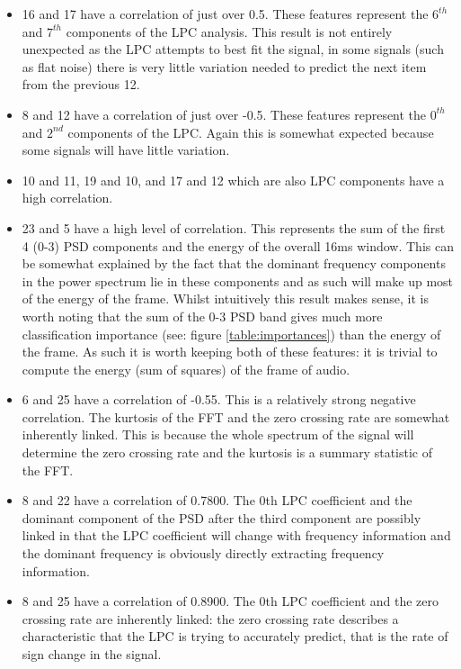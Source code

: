 \documentclass[ %
                    author={Sam Phippen},
                supervisor={Dr. Rafal Bogacz},
                     title={Real time voice activity detectors in noisy personal computing environments},
                  subtitle={},
                    degree={MEng},
                      year={2012} ]{thesis}
\begin{document}
\begin{itemize}

    \item 16 and 17 have a correlation of just over 0.5. These features
        represent the $6^{th}$ and $7^{th}$ components of the LPC analysis.
        This result is not entirely unexpected as the LPC attempts to best fit
        the signal, in some signals (such as flat noise) there is very little
        variation needed to predict the next item from the previous 12.

    \item 8 and 12 have a correlation of just over -0.5. These features
        represent the $0^{th}$ and $2^{nd}$ components of the LPC. Again this
        is somewhat expected because some signals will have little variation.

    \item 10 and 11, 19 and 10, and 17 and 12 which are also LPC components
        have a high correlation.

    \item 23 and 5 have a high level of correlation. This represents the sum of
        the first 4 (0-3) PSD components and the energy of the overall 16ms
        window. This can be somewhat explained by the fact that the dominant
        frequency components in the power spectrum lie in these components and
        as such will make up most of the energy of the frame. Whilst
        intuitively this result makes sense, it is worth noting that the sum of
        the 0-3 PSD band gives much more classification importance (see: figure
        \ref{table:importances}) than the energy of the frame. As such it is
        worth keeping both of these features: it is trivial to compute the
        energy (sum of squares) of the frame of audio.

    \item 6 and 25 have a correlation of -0.55. This is a relatively strong
        negative correlation. The kurtosis of the FFT and the zero crossing
        rate are somewhat inherently linked. This is because the whole spectrum
        of the signal will determine the zero crossing rate and the kurtosis
        is a summary statistic of the FFT.

    \item 8 and 22 have a correlation of 0.7800. The 0th LPC coefficient and the
        dominant component of the PSD after the third component are possibly
        linked in that the LPC coefficient will change with frequency
        information and the dominant frequency is obviously directly extracting
        frequency information.

    \item 8 and 25 have a correlation of 0.8900. The 0th LPC coefficient and the
        zero crossing rate are inherently linked: the zero crossing rate
        describes a characteristic that the LPC is trying to accurately
        predict, that is the rate of sign change in the signal.

\end{itemize}
\end{document}
